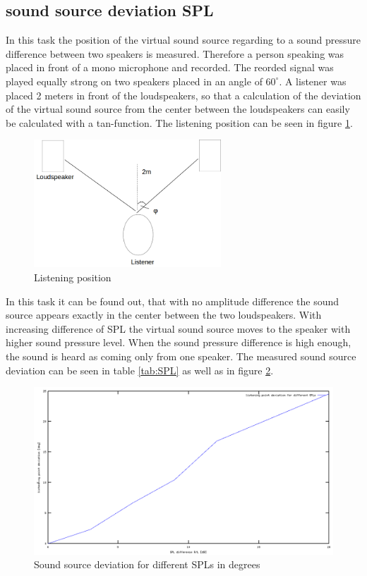 \documentclass{article}
\begin{document}
\subsection{sound source deviation SPL}
In this task the position of the virtual sound source regarding to a sound pressure difference between two speakers is measured. Therefore a person speaking was placed in front of a mono microphone and recorded. The reorded signal was played equally strong on two speakers placed in an angle of $60^\circ$. A listener was placed 2 meters in front of the loudspeakers, so that a calculation of the deviation of the virtual sound source from the center between the loudspeakers can easily be calculated with a tan-function. The listening position can be seen in figure \ref{fig:listening}.
\begin{figure}[htbp]
\begin{center}
\includegraphics[width=7cm,keepaspectratio=true]{listening}
\caption{Listening position}
\label{fig:listening}
\end{center}
\end{figure}
In this task it can be found out, that with no amplitude difference the sound source appears exactly in the center between the two loudspeakers. With increasing difference of SPL the virtual sound source moves to the speaker with higher sound pressure level. When the sound pressure difference is high enough, the sound is heard as coming only from one speaker. The measured sound source deviation can be seen in table \ref{tab:SPL} as well as in figure \ref{fig:SPL}.
\begin{figure}[htbp]
\begin{center}
\includegraphics[width=15cm,keepaspectratio=true]{SPL}
\caption{Sound source deviation for different SPLs in degrees}
\label{fig:SPL}
\end{center}
\end{figure}
\end{document}
